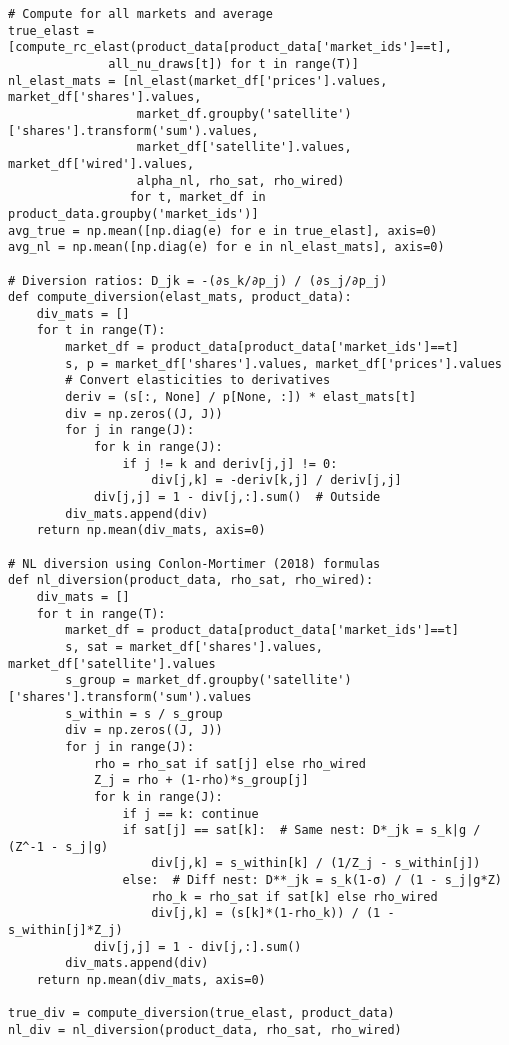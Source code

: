 \documentclass[english,11pt]{article}
\begin{document}
\begin{enumerate}
\begin{verbatim}
# Compute for all markets and average
true_elast = [compute_rc_elast(product_data[product_data['market_ids']==t], 
              all_nu_draws[t]) for t in range(T)]
nl_elast_mats = [nl_elast(market_df['prices'].values, market_df['shares'].values,
                  market_df.groupby('satellite')['shares'].transform('sum').values,
                  market_df['satellite'].values, market_df['wired'].values,
                  alpha_nl, rho_sat, rho_wired) 
                 for t, market_df in product_data.groupby('market_ids')]
avg_true = np.mean([np.diag(e) for e in true_elast], axis=0)
avg_nl = np.mean([np.diag(e) for e in nl_elast_mats], axis=0)

# Diversion ratios: D_jk = -(∂s_k/∂p_j) / (∂s_j/∂p_j)
def compute_diversion(elast_mats, product_data):
    div_mats = []
    for t in range(T):
        market_df = product_data[product_data['market_ids']==t]
        s, p = market_df['shares'].values, market_df['prices'].values
        # Convert elasticities to derivatives
        deriv = (s[:, None] / p[None, :]) * elast_mats[t]
        div = np.zeros((J, J))
        for j in range(J):
            for k in range(J):
                if j != k and deriv[j,j] != 0:
                    div[j,k] = -deriv[k,j] / deriv[j,j]
            div[j,j] = 1 - div[j,:].sum()  # Outside
        div_mats.append(div)
    return np.mean(div_mats, axis=0)

# NL diversion using Conlon-Mortimer (2018) formulas
def nl_diversion(product_data, rho_sat, rho_wired):
    div_mats = []
    for t in range(T):
        market_df = product_data[product_data['market_ids']==t]
        s, sat = market_df['shares'].values, market_df['satellite'].values
        s_group = market_df.groupby('satellite')['shares'].transform('sum').values
        s_within = s / s_group
        div = np.zeros((J, J))
        for j in range(J):
            rho = rho_sat if sat[j] else rho_wired
            Z_j = rho + (1-rho)*s_group[j]
            for k in range(J):
                if j == k: continue
                if sat[j] == sat[k]:  # Same nest: D*_jk = s_k|g / (Z^-1 - s_j|g)
                    div[j,k] = s_within[k] / (1/Z_j - s_within[j])
                else:  # Diff nest: D**_jk = s_k(1-σ) / (1 - s_j|g*Z)
                    rho_k = rho_sat if sat[k] else rho_wired
                    div[j,k] = (s[k]*(1-rho_k)) / (1 - s_within[j]*Z_j)
            div[j,j] = 1 - div[j,:].sum()
        div_mats.append(div)
    return np.mean(div_mats, axis=0)

true_div = compute_diversion(true_elast, product_data)
nl_div = nl_diversion(product_data, rho_sat, rho_wired)
\end{verbatim}


\end{enumerate}
\end{document}
